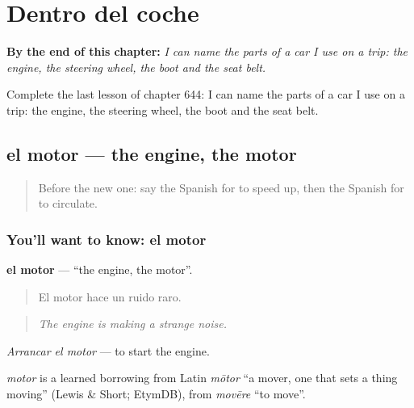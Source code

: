 
\chapter{Dentro del coche}
\label{ch:es-dentro-del-coche}

\begin{chapteropening}
\textbf{By the end of this chapter:} \emph{I can name the parts of a car I use on a trip: the engine, the steering wheel, the boot and the seat belt.}

Complete the last lesson of chapter 644: I can name the parts of a car I use on a trip: the engine, the steering wheel, the boot and the seat belt.
\end{chapteropening}

\section[el motor]{el motor — the engine, the motor}

\label{lesson:ES-C644-motor}



\begin{quote}
Before the new one: say the Spanish for to speed up, then the Spanish for to circulate.
\end{quote}

\subsection*{You'll want to know: el motor}
\textbf{el motor} — \textquotedblleft{}the engine, the motor\textquotedblright{}.

\begin{quote}
El motor hace un ruido raro.
\end{quote}

\begin{quote}
\emph{The engine is making a strange noise.}
\end{quote}

\emph{Arrancar el motor} — to start the engine.

\begin{cousinweb}
\emph{motor} is a learned borrowing from Latin \emph{mōtor} \textquotedblleft{}a mover, one that sets a thing moving\textquotedblright{} (Lewis \& Short; EtymDB), from \emph{movēre} \textquotedblleft{}to move\textquotedblright{}.
\end{cousinweb}

